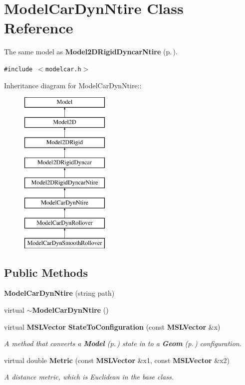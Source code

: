\section{Model\-Car\-Dyn\-Ntire  Class Reference}
\label{classModelCarDynNtire}
The same model as {\bf Model2DRigid\-Dyncar\-Ntire} {\rm (p.\,\pageref{classModel2DRigidDyncarNtire})}. 


{\tt \#include $<$modelcar.h$>$}

Inheritance diagram for Model\-Car\-Dyn\-Ntire::\begin{figure}[H]
\begin{center}
\leavevmode
\includegraphics[height=8cm]{classModelCarDynNtire}
\end{center}
\end{figure}
\subsection*{Public Methods}
\begin{CompactItemize}
\item 
{\bf Model\-Car\-Dyn\-Ntire} (string path)
\item 
virtual {\bf $\sim$Model\-Car\-Dyn\-Ntire} ()
\item 
virtual {\bf MSLVector} {\bf State\-To\-Configuration} (const {\bf MSLVector} \&x)
\begin{CompactList}\small\item\em A method that converts a {\bf Model} {\rm (p.\,\pageref{classModel})} state in to a {\bf Geom} {\rm (p.\,\pageref{classGeom})} configuration.\item\end{CompactList}\item 
virtual double {\bf Metric} (const {\bf MSLVector} \&x1, const {\bf MSLVector} \&x2)
\begin{CompactList}\small\item\em A distance metric, which is Euclidean in the base class.\item\end{CompactList}\end{CompactItemize}


